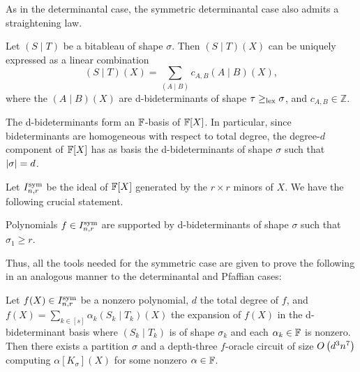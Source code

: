 \documentclass[letterpaper, 11pt]{amsart}
\newif\iffull
\begin{document}
\iffull
The following lemma shows that every monomial in $\F[X]$ can be expressed as a bideterminant, and hence the bideterminants span $\F[X]$.
The proof is immediate from the definition.
\begin{lem}\label{lem:sym_det_monomial}
    A degree $d$ monomial $\prod_{i = 1}^d x_{r_i, c_i}$ where for each $1 \leq i \leq d$, $r_{i} \leq c_i$ is given by a bideterminant:
    \[
	   \newcommand{\ra}{r_1}
	   \newcommand{\rb}{r_2}
	   \newcommand{\rd}{r_d}
	   \newcommand{\ca}{c_1}
	   \newcommand{\cb}{c_2}
	   \newcommand{\cd}{c_d}
	   \left(\ \Yvcentermath1 \left.\young(\ra,\rb,\svdots,\rd) \ \right\vert\ \young(\ca,\cb,\svdots,\cd) \ \right)(X) = \prod_{i = 1}^d x_{r_i, c_i}.
    \]
\end{lem}
\fi

As in the determinantal case, the symmetric determinantal case also admits a straightening law.
\begin{thrm}\label{thrm:det_sym_straightening}
    Let $(S \mid T)$ be a bitableau of shape $\sigma$.
    Then $(S \mid T)(X)$ can be uniquely expressed as a linear combination
    \[
        (S \mid T)(X) = \sum_{(A \mid B)} c_{A, B} (A \mid B)(X),
    \]
    where the $(A \mid B)(X)$ are d-bideterminants of shape $\tau \geq_{\operatorname{lex}} \sigma$, and $c_{A,B} \in \mathbb{Z}$.
\end{thrm}

\iffull
\Cref{lem:sym_det_monomial} and \Cref{thrm:det_sym_straightening} together imply the following corollary.
\fi

\begin{cor}\label{cor:sym-det-basis}
The d-bideterminants form an $\mathbb{F}$-basis of $\F[X]$.
In particular, since bideterminants are homogeneous with respect to total degree, the degree-$d$ component of $\F[X]$ has as basis the d-bideterminants of shape $\sigma$ such that $\abs{\sigma} = d$.
\end{cor}

Let $I^{\operatorname{sym}}_{n, r}$ be the ideal of $\F[X]$ generated by the $r \times r$ minors of $X$.
We have the following crucial statement.
\begin{prop}\label{prop:det_sym_shape}
    Polynomials $f \in I^{\operatorname{sym}}_{n, r}$ are supported by d-bideterminants of shape $\sigma$ such that $\sigma_1 \geq r$.
\end{prop}

Thus, all the tools needed for the symmetric case are given to prove the following in an analogous manner to the determinantal and Pfaffian cases:
\begin{thrm}\label{thrm:sym_det_canonical_extraction}
    Let $f(X) \in I^{\operatorname{sym}}_{n, r}$ be a nonzero polynomial, $d$ the total degree of $f$, and $f(X) = \sum_{k \in [s]} \alpha_k (S_k \mid T_k)(X)$ the expansion of $f(X)$ in the d-bideterminant basis where $(S_k \mid T_k)$ is of shape $\sigma_k$ and each $\alpha_k \in \mathbb{F}$ is nonzero.
    Then there exists a partition $\sigma$ and a depth-three $f$-oracle circuit of size $O\kern-0.0pt\left(d^3 n^7\right)$ computing $\alpha [K_\sigma](X)$ for some nonzero $\alpha \in \mathbb{F}$.
\end{thrm}
\end{document}
